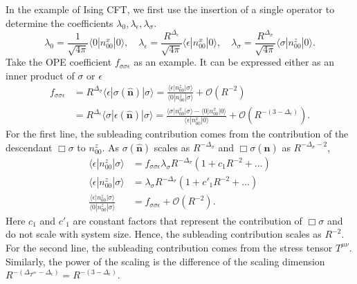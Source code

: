 \documentclass{timesjhep}
\begin{document}
In the example of Ising CFT, we first use the insertion of a single operator to determine the coefficients $\lambda_0,\lambda_\epsilon,\lambda_\sigma$. 
\begin{equation}
    \lambda_0=\frac{1}{\sqrt{4\pi}}\langle 0|n^x_{00}|0\rangle,\quad\lambda_\epsilon=\frac{R^{\Delta_\epsilon}}{\sqrt{4\pi}}\langle \epsilon|n^x_{00}|0\rangle,\quad\lambda_\sigma=\frac{R^{\Delta_\sigma}}{\sqrt{4\pi}}\langle \sigma|n^z_{00}|0\rangle.
\end{equation} 
Take the OPE coefficient $f_{\sigma\sigma\epsilon}$ as an example. It can be expressed either as an inner product of $\sigma$ or $\epsilon$
\begin{align}
    f_{\sigma\sigma\epsilon}&=R^{\Delta_\sigma}\langle\epsilon|\sigma(\hat{\mathbf{n}})|\sigma\rangle=\frac{\langle\epsilon|n_{00}^z|\sigma\rangle}{\langle 0|n_{00}^z|\sigma\rangle}+\mathcal{O}(R^{-2})\nonumber\\
    &=R^{\Delta_\epsilon}\langle\sigma|\epsilon(\hat{\mathbf{n}})|\sigma\rangle=\frac{\langle\sigma|n^x_{00}|\sigma\rangle-\langle0|n^x_{00}|0\rangle}{\langle\epsilon|n^x_{00}|0\rangle}+\mathcal{O}(R^{-(3-\Delta_\epsilon)}).
\end{align} 
For the first line, the subleading contribution comes from the contribution of the descendant $\Box\sigma$ to $n_{00}^z$. As $\sigma(\hat{\mathbf{n}})$ scales as $R^{-\Delta_\sigma}$ and $\Box\sigma(\hat{\mathbf{n}})$ as $R^{-\Delta_\sigma-2}$, 
\begin{align}
    \langle\epsilon|n_{00}^z|\sigma\rangle&=f_{\sigma\sigma\epsilon}\lambda_\sigma R^{-\Delta_\sigma}(1+c_1R^{-2}+\dots)\nonumber\\
    \langle\epsilon|n_{00}^z|\sigma\rangle&=\lambda_\sigma R^{-\Delta_\sigma}(1+c'_1R^{-2}+\dots)\nonumber\\
    \frac{\langle\epsilon|n_{00}^z|\sigma\rangle}{\langle 0|n_{00}^z|\sigma\rangle}&=f_{\sigma\sigma\epsilon}+\mathcal{O}(R^{-2}).
\end{align} 
Here $c_1$ and $c'_1$ are constant factors that represent the contribution of $\Box\sigma$ and do not scale with system size. Hence, the subleading contribution scales as $R^{-2}$. For the second line, the subleading contribution comes from the stress tensor $T^{\mu\nu}$. Similarly, the power of the scaling is the difference of the scaling dimension $R^{-(\Delta_{T^{\mu\nu}}-\Delta_\epsilon)}=R^{-(3-\Delta_\epsilon)}$. 
\end{document}
